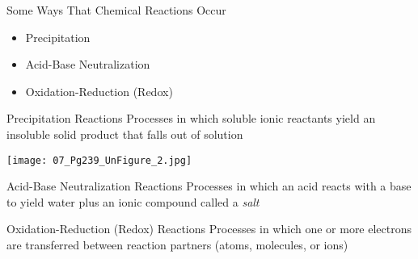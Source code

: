 \documentclass[handout]{beamer}
\begin{document}
\begin{frame}{Some Ways That Chemical Reactions Occur}
	\begin{itemize}
		\item Precipitation
		\item Acid-Base Neutralization
		\item Oxidation-Reduction (Redox)
	\end{itemize}
\end{frame}

\begin{frame}{Precipitation Reactions}
	Processes in which soluble ionic reactants yield an insoluble solid
	product that falls out of solution

	\begin{center}
	\end{center}

	\begin{center}
		\texttt{[image: 07\_Pg239\_UnFigure\_2.jpg]}
	\end{center}
\end{frame}

\begin{frame}{Acid-Base Neutralization Reactions}
	Processes in which an acid reacts with a base to yield water plus an
	ionic compound called a \emph{salt}

	\begin{center}
	\end{center}
\end{frame}

\begin{frame}{Oxidation-Reduction (Redox) Reactions}
	Processes in which one or more electrons are transferred between
	reaction partners (atoms, molecules, or ions)

	\begin{center}
	\end{center}
\end{frame}
\end{document}
